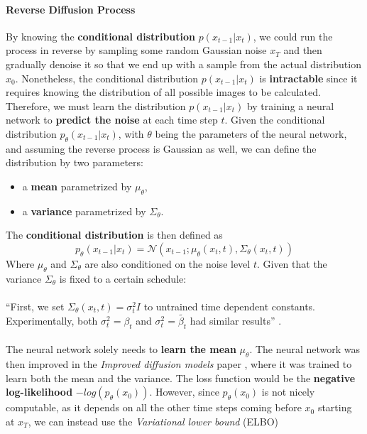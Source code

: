 \documentclass[preprint]{elsarticle}
\begin{document}
\paragraph{Reverse Diffusion Process}
By knowing the \textbf{conditional distribution} $p(x_{t-1}|x_t)$, 
we could run the process in reverse by sampling some random Gaussian noise $x_T$
and then gradually denoise it so that we end up with a sample from the actual distribution $x_0$.
Nonetheless, the conditional distribution $p(x_{t-1}|x_t)$ is \textbf{intractable} since 
it requires knowing the distribution of all possible images to be calculated.
Therefore, we must learn the distribution $p(x_{t-1}|x_t)$ by training a neural network to \textbf{predict the noise} at each time step $t$.
Given the conditional distribution $p_\theta(x_{t-1}|x_t)$, 
with $\theta$ being the parameters of the neural network, 
and assuming the reverse process is Gaussian as well, 
we can define the distribution by two parameters:
\begin{itemize}
	\item a \textbf{mean} parametrized by $\mu_\theta$,
	\item a \textbf{variance} parametrized by $\Sigma_\theta$.
\end{itemize}
The \textbf{conditional distribution} is then defined as
\begin{equation}
	p_\theta(x_{t-1}|x_t) = \mathcal{N}(x_{t-1}; \mu_\theta(x_t,t), \Sigma_\theta(x_t,t))
\end{equation}
Where $\mu_\theta$ and $\Sigma_\theta$ are also conditioned on the noise level $t$.
Given that the variance $\Sigma_\theta$ is fixed to a certain schedule:\\\\
``First, we set $\Sigma_\theta(x_t,t)=\sigma_t^2I$ to untrained time dependent constants.
Experimentally, both $\sigma_t^2=\beta_t$ and $\sigma_t^2=\tilde{\beta_t}$ had similar results'' 
\cite{ho2020denoising}.\\\\
The neural network solely needs to \textbf{learn the mean} $\mu_\theta$.
The neural network was then improved in the \emph{Improved diffusion models} paper \cite{nichol2021improved}, 
where it was trained to learn both the mean and the variance.
The loss function would be the \textbf{negative log-likelihood} $-log(p_\theta(x_0))$. 
However, since $p_\theta(x_0)$ is not nicely computable, as it depends on all the other time steps coming before 
$x_0$ starting at $x_T$, we can instead use the \emph{Variational lower bound} (ELBO) 
\end{document}
